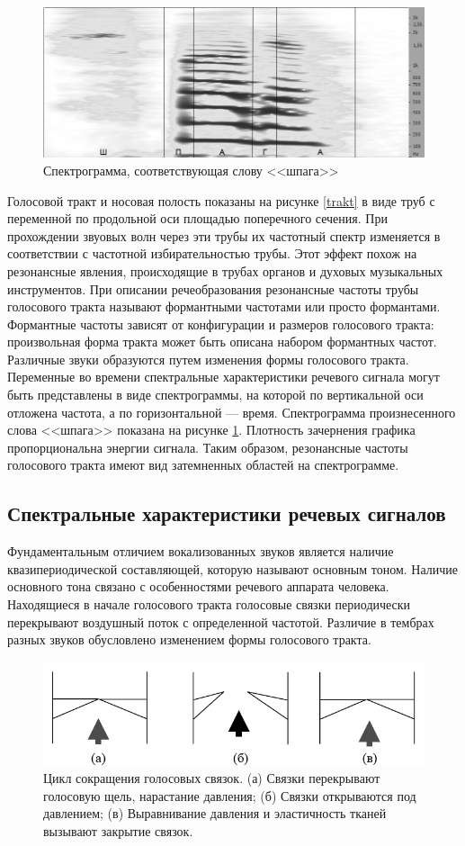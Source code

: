 \documentclass[a4paper,14pt,russian,utf8,nocolumnsxix,nocolumnxxxi,nocolumnxxxii]{eskdtext}
\begin{document}
\begin{figure}[h]	
	\centering
	\includegraphics[width=120mm]{shpaga_spect.png}			
	\caption{Спектрограмма, соответствующая слову <<шпага>>}
	\label{shpaga_spect}
\end{figure}
Голосовой тракт и носовая полость показаны на рисунке \ref{trakt} в виде труб с переменной по продольной оси площадью поперечного сечения. При прохождении звуовых волн через эти трубы их частотный спектр изменяется в соответствии с частотной избирательностью трубы. Этот эффект похож на резонансные явления, происходящие в трубах органов и духовых музыкальных инструментов. При описании речеобразования резонансные частоты трубы голосового тракта называют формантными частотами или просто формантами. Формантные частоты зависят от конфигурации и размеров голосового тракта: произвольная форма тракта может быть описана набором формантных частот. Различные звуки образуются путем изменения формы голосового тракта. Переменные во времени спектральные характеристики речевого сигнала могут быть представлены в виде спектрограммы, на которой по вертикальной оси отложена частота, а по горизонтальной --- время. Спектрограмма произнесенного слова <<шпага>> показана на рисунке \ref{shpaga_spect}. Плотность зачернения графика пропорциональна энергии сигнала. Таким образом, резонансные частоты голосового тракта имеют вид затемненных областей на спектрограмме. 

\subsection{Спектральные характеристики речевых сигналов}
Фундаментальным отличием вокализованных звуков является наличие квазипериодической составляющей, которую называют основным тоном. Наличие основного тона связано с особенностями речевого аппарата человека. Находящиеся в начале голосового тракта голосовые связки периодически перекрывают воздушный поток с определенной частотой. Различие в тембрах разных звуков обусловлено изменением формы голосового тракта.\cite{rabiner_eng}
\begin{figure}[h]	
	\centering
	\includegraphics[width=120mm]{larynx.png}			
	\caption{Цикл сокращения голосовых связок. (а) Связки перекрывают голосовую щель, нарастание давления; (б) Связки открываются под давлением; (в) Выравнивание давления и эластичность тканей вызывают закрытие связок.}
	\label{larynx}
\end{figure}
\end{document}
